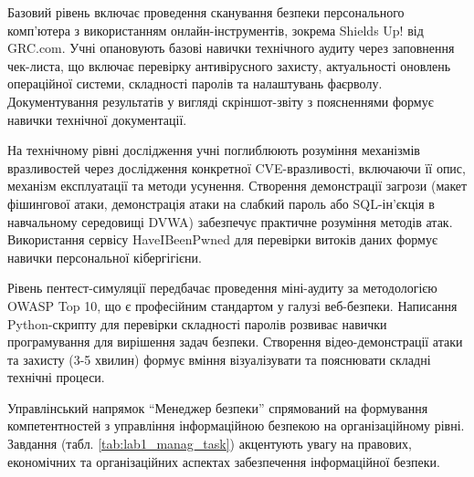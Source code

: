 Базовий рівень включає проведення сканування безпеки персонального комп'ютера з використанням онлайн-інструментів, зокрема Shields Up! від GRC.com. Учні опановують базові навички технічного аудиту через заповнення чек-листа, що включає перевірку антивірусного захисту, актуальності оновлень операційної системи, складності паролів та налаштувань фаєрволу. Документування результатів у вигляді скріншот-звіту з поясненнями формує навички технічної документації.

На технічному рівні дослідження учні поглиблюють розуміння механізмів вразливостей через дослідження конкретної CVE-вразливості, включаючи її опис, механізм експлуатації та методи усунення. Створення демонстрації загрози (макет фішингової атаки, демонстрація атаки на слабкий пароль або SQL-ін'єкція в навчальному середовищі DVWA) забезпечує практичне розуміння методів атак. Використання сервісу HaveIBeenPwned для перевірки витоків даних формує навички персональної кібергігієни.

Рівень пентест-симуляції передбачає проведення міні-аудиту за методологією OWASP Top 10, що є професійним стандартом у галузі веб-безпеки. Написання Python-скрипту для перевірки складності паролів розвиває навички програмування для вирішення задач безпеки. Створення відео-демонстрації атаки та захисту (3-5 хвилин) формує вміння візуалізувати та пояснювати складні технічні процеси.

Управлінський напрямок ``Менеджер безпеки'' спрямований на формування компетентностей з управління інформаційною безпекою на організаційному рівні. Завдання (табл. \ref{tab:lab1_manag_task}) акцентують увагу на правових, економічних та організаційних аспектах забезпечення інформаційної безпеки.


